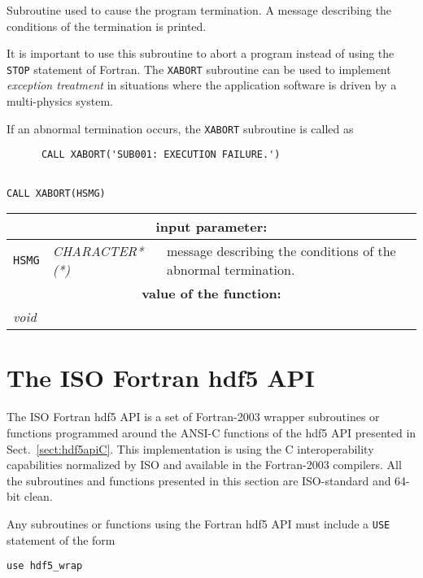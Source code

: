 Subroutine used to cause the program termination. A message describing the conditions of the
termination is printed.

\vskip 0.2cm

It is important to use this subroutine to abort a program instead of using the {\tt STOP}
statement of Fortran. The {\tt XABORT} subroutine can be used to implement {\sl exception
treatment} in situations where the application software is driven by a multi-physics system.

\vskip 0.2cm

If an abnormal termination occurs, the {\tt XABORT} subroutine is called as
\begin{verbatim}
      CALL XABORT('SUB001: EXECUTION FAILURE.')
\end{verbatim}

\begin{verbatim}

CALL XABORT(HSMG)
\end{verbatim}

\noindent
\begin{tabular}{|p{1.5cm}|p{3cm}|p{10cm}|}
\hline
\multicolumn{3}{|c|}{\bf input parameter:} \\
\hline
{\tt HSMG} & {\it CHARACTER*(*)} & message describing the conditions of the abnormal termination. \\
\hline
\multicolumn{3}{|c|}{\bf value of the function:} \\
\hline
\multicolumn{2}{|l|}{\it void} &  \\
\hline
\end{tabular}

\clearpage

\section {The ISO Fortran {\sc hdf5} API}

The ISO Fortran {\sc hdf5} API is a set of Fortran-2003 wrapper subroutines or functions programmed around the ANSI-C functions of the {\sc hdf5} API presented in Sect.~\ref{sect:hdf5apiC}. This implementation is using
the C interoperability capabilities normalized by ISO and available in the Fortran-2003 compilers. All the subroutines and functions presented in this section are ISO-standard and 64-bit clean.

\vskip 0.08cm

Any subroutines or functions using the Fortran {\sc hdf5} API must include a {\tt USE} statement of the form
\begin{verbatim}
use hdf5_wrap
\end{verbatim}

